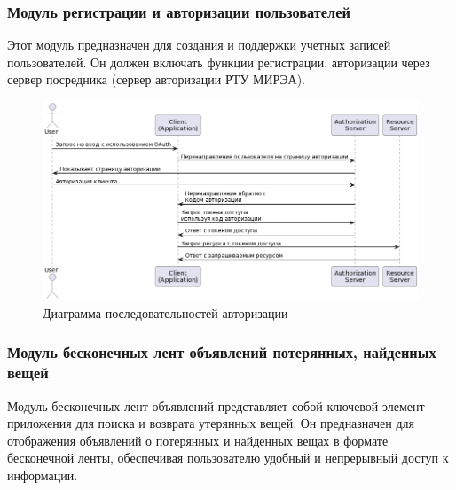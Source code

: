 \subsubsection{Модуль регистрации и авторизации пользователей}

Этот модуль предназначен для создания и поддержки учетных записей пользователей. Он должен включать функции регистрации, авторизации через сервер посредника (сервер авторизации РТУ МИРЭА).


\begin{figure}[htb]
	\centering
	\includegraphics[width=.9\textwidth]{images/registation-diagram.png}
	\parskip=6pt
	\caption{Диаграмма последовательностей авторизации}
	\label{fig:authDiagram}
\end{figure}

\subsubsection{Модуль бесконечных лент объявлений потерянных, найденных вещей}

Модуль бесконечных лент объявлений представляет собой ключевой элемент приложения для поиска и возврата утерянных вещей. Он предназначен для отображения объявлений о потерянных и найденных вещах в формате бесконечной ленты, обеспечивая пользователю удобный и непрерывный доступ к информации.

